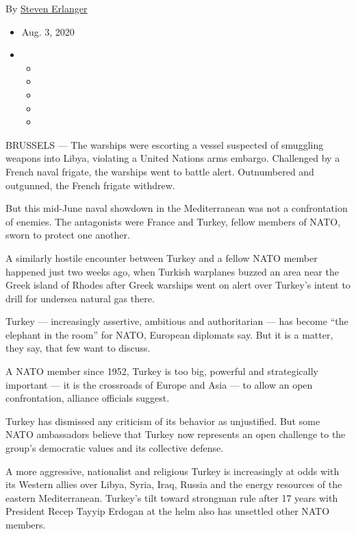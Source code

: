 By \href{https://www.nytimes3xbfgragh.onion/by/steven-erlanger}{Steven
Erlanger}

\begin{itemize}
\item
  Aug. 3, 2020
\item
  \begin{itemize}
  \item
  \item
  \item
  \item
  \item
  \end{itemize}
\end{itemize}

BRUSSELS --- The warships were escorting a vessel suspected of smuggling
weapons into Libya, violating a United Nations arms embargo. Challenged
by a French naval frigate, the warships went to battle alert.
Outnumbered and outgunned, the French frigate withdrew.

But this mid-June naval showdown in the Mediterranean was not a
confrontation of enemies. The antagonists were France and Turkey, fellow
members of NATO, sworn to protect one another.

A similarly hostile encounter between Turkey and a fellow NATO member
happened just two weeks ago, when Turkish warplanes buzzed an area near
the Greek island of Rhodes after Greek warships went on alert over
Turkey's intent to drill for undersea natural gas there.

Turkey --- increasingly assertive, ambitious and authoritarian --- has
become ``the elephant in the room'' for NATO, European diplomats say.
But it is a matter, they say, that few want to discuss.

A NATO member since 1952, Turkey is too big, powerful and strategically
important --- it is the crossroads of Europe and Asia --- to allow an
open confrontation, alliance officials suggest.

Turkey has dismissed any criticism of its behavior as unjustified. But
some NATO ambassadors believe that Turkey now represents an open
challenge to the group's democratic values and its collective defense.

A more aggressive, nationalist and religious Turkey is increasingly at
odds with its Western allies over Libya, Syria, Iraq, Russia and the
energy resources of the eastern Mediterranean. Turkey's tilt toward
strongman rule after 17 years with President Recep Tayyip Erdogan at the
helm also has unsettled other NATO members.

